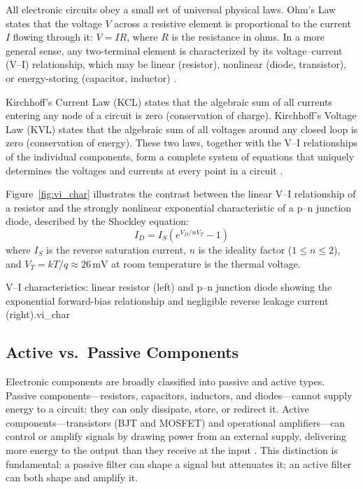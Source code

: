 All electronic circuits obey a small set of universal physical laws. Ohm's Law
states that the voltage $V$ across a resistive element is proportional to the current $I$
flowing through it: $V = IR$, where $R$ is the resistance in ohms. In a more general
sense, any two-terminal element is characterized by its voltage--current (V--I)
relationship, which may be linear (resistor), nonlinear (diode, transistor), or
energy-storing (capacitor, inductor) \cite{floyd2012}.

Kirchhoff's Current Law (KCL) states that the algebraic sum of all currents
entering any node of a circuit is zero (conservation of charge). Kirchhoff's
Voltage Law (KVL) states that the algebraic sum of all voltages around any closed loop
is zero (conservation of energy). These two laws, together with the V--I relationships of
the individual components, form a complete system of equations that uniquely determines
the voltages and currents at every point in a circuit \cite{floyd2012}.

Figure~\ref{fig:vi_char} illustrates the contrast between the linear V--I relationship
of a resistor and the strongly nonlinear exponential characteristic of a p--n junction
diode, described by the Shockley equation:
\[
  I_D = I_S \left( e^{V_D / nV_T} - 1 \right)
\]
where $I_S$ is the reverse saturation current, $n$ is the ideality factor
($1 \leq n \leq 2$), and $V_T = kT/q \approx 26\,\text{mV}$ at room temperature is the
thermal voltage.

%
  {V--I characteristics: linear resistor (left) and p--n junction diode
   showing the exponential forward-bias relationship and negligible reverse
   leakage current (right).}{vi_char}

\subsection*{Active vs.\ Passive Components}

Electronic components are broadly classified into passive and
active types. Passive components---resistors, capacitors, inductors, and
diodes---cannot supply energy to a circuit; they can only dissipate, store, or redirect
it. Active components---transistors (BJT and MOSFET) and operational amplifiers---can
control or amplify signals by drawing power from an external supply, delivering more
energy to the output than they receive at the input \cite{sedra2020}. This distinction is
fundamental: a passive filter can shape a signal but attenuates it; an active filter can
both shape and amplify it.

